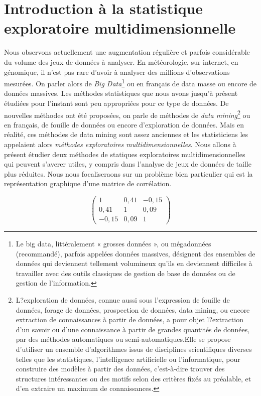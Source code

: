 \section{Introduction à la statistique exploratoire multidimensionnelle}
Nous observons actuellement une augmentation régulière et parfois considérable du volume des jeux de données à analyser. En météorologie, sur internet, en génomique, il n'est pas rare d'avoir à analyser des millions d'observations mesurées. On parler alors de \textit{Big Data}\footnote{Le big data, littéralement « grosses données », ou mégadonnées (recommandé), parfois appelées données massives, désignent des ensembles de données qui deviennent tellement volumineux qu'ils en deviennent difficiles à travailler avec des outils classiques de gestion de base de données ou de gestion de l'information.} ou en français de data masse ou encore de données massives.\newline
Les méthodes statistiques que nous avons jusqu'à présent étudiées pour l'instant sont peu appropriées pour ce type de données. De nouvelles méthodes ont été proposées, on parle de méthodes de \textit{data mining}\footnote{L?exploration de données, connue aussi sous l'expression de fouille de données, forage de données, prospection de données, data mining, ou encore extraction de connaissances à partir de données, a pour objet l?extraction d'un savoir ou d'une connaissance à partir de grandes quantités de données, par des méthodes automatiques ou semi-automatiques.\newline Elle se propose d'utiliser un ensemble d'algorithmes issus de disciplines scientifiques diverses telles que les statistiques, l'intelligence artificielle ou l'informatique, pour construire des modèles à partir des données, c'est-à-dire trouver des structures intéressantes ou des motifs selon des critères fixés au préalable, et d'en extraire un maximum de connaissances.} ou en français, de fouille de données ou encore d'exploration de données. Mais en réalité, ces méthodes de data mining sont assez anciennes et les statisticiens les appelaient alors \textit{méthodes exploratoires multidimensionnelles}.\newline
Nous allons à présent étudier deux méthodes de statiques exploratoires multidimensionnelles qui peuvent s'averer utiles, y compris dans l'analyse de jeux de données de taille plus réduites. Nous nous focaliseraons sur un problème bien particulier qui est la représentation graphique d'une matrice de corrélation.

$$\begin{pmatrix} 
1 & 0,41 & -0,15 \\
0,41 & 1 & 0,09 \\
- 0,15 & 0,09 & 1 
\end{pmatrix}$$

